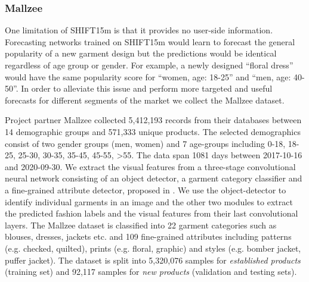 \documentclass{article}
\begin{document}
\subsubsection{\textbf{Mallzee}}
One limitation of SHIFT15m is that it provides no user-side information. Forecasting networks trained on SHIFT15m would learn to forecast the general popularity of a new garment design but the predictions would be identical regardless of age group or gender. For example, a newly designed ``floral dress'' would have the same popularity score for ``women, age: 18-25'' and ``men, age: 40-50''. 
In order to alleviate this issue and perform more targeted and useful forecasts for different segments of the market we collect the Mallzee dataset.

Project partner Mallzee collected 5,412,193 records from their databases between 14 demographic groups and 571,333 unique products. The selected demographics consist of two gender groups (men, women) and 7 age-groups including 0-18, 18-25, 25-30, 30-35, 35-45, 45-55, >55. The data span 1081 days between 2017-10-16 and 2020-09-30. We extract the visual features from a three-stage convolutional neural network consisting of an object detector, a garment category classifier and a fine-grained attribute detector, proposed in \cite{papadopoulos2022attentive}. We use the object-detector to identify individual garments in an image and the other two modules to extract the predicted fashion labels and the visual features from their last convolutional layers. The Mallzee dataset is classified into 22 garment categories such as blouses, dresses, jackets etc. and 109 fine-grained attributes including patterns (e.g. checked, quilted), prints (e.g. floral, graphic) and styles (e.g. bomber jacket, puffer jacket). The dataset is  split into 5,320,076 samples for \textit{established products} (training set) and 92,117 samples for \textit{new products} (validation and testing sets).
\end{document}
